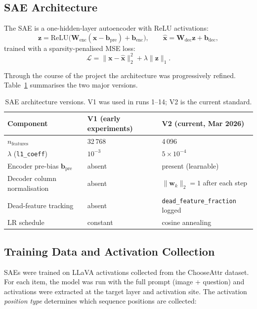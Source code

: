 \documentclass[11pt,a4paper]{article}
\begin{document}
\subsection{SAE Architecture}
\label{sec:sae_arch}

The SAE is a one-hidden-layer autoencoder with ReLU activations:
\begin{equation}
  \mathbf{z} = \mathrm{ReLU}\bigl(\mathbf{W}_{\mathrm{enc}}(\mathbf{x} - \mathbf{b}_{\mathrm{pre}})
    + \mathbf{b}_{\mathrm{enc}}\bigr),
  \qquad
  \hat{\mathbf{x}} = \mathbf{W}_{\mathrm{dec}}\mathbf{z} + \mathbf{b}_{\mathrm{dec}},
  \label{eq:sae}
\end{equation}
trained with a sparsity-penalised MSE loss:
\begin{equation}
  \mathcal{L} = \|\mathbf{x} - \hat{\mathbf{x}}\|_2^2 + \lambda \|\mathbf{z}\|_1.
  \label{eq:sae_loss}
\end{equation}

Through the course of the project the architecture was progressively refined.
Table~\ref{tab:sae_versions} summarises the two major versions.

\begin{table}[ht]
\centering
\caption{SAE architecture versions. V1 was used in runs 1--14; V2 is the current standard.}
\label{tab:sae_versions}
\begin{tabular}{lll}
\toprule
Component & V1 (early experiments) & V2 (current, Mar 2026) \\
\midrule
$n_{\mathrm{features}}$ & 32\,768 & 4\,096 \\
$\lambda$ (\texttt{l1\_coeff}) & $10^{-3}$ & $5 \times 10^{-4}$ \\
Encoder pre-bias $\mathbf{b}_{\mathrm{pre}}$ & absent & present (learnable) \\
Decoder column normalisation & absent & $\|\mathbf{w}_k\|_2 = 1$ after each step \\
Dead-feature tracking & absent & \texttt{dead\_feature\_fraction} logged \\
LR schedule & constant & cosine annealing \\
\bottomrule
\end{tabular}
\end{table}

\subsection{Training Data and Activation Collection}

SAEs were trained on LLaVA activations collected from the ChooseAttr dataset.
For each item, the model was run with the full prompt (image + question) and activations were
extracted at the target layer and activation site.
The activation \emph{position type} determines which sequence positions are collected:
\end{document}
